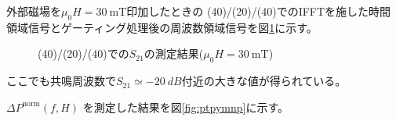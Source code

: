 \documentclass[dvipdfmx,11pt]{jsreport}
\numberwithin{equation}{chapter}
\numberwithin{table}{chapter}
\begin{document}
外部磁場を$\mu_0 H=\SI{30}{\milli \tesla}$印加したときの
(40)/(20)/(40)でのIFFTを施した時間領域信号とゲーティング処理後の周波数領域信号を図\ref{fig:k4}に示す。
\begin{figure}[H]
	\centering
		\caption{(40)/(20)/(40)での$S_{21}$の測定結果($\mu_0 H=\SI{30}{\milli \tesla}$)}
    \label{fig:k4}
\end{figure}
ここでも共鳴周波数で$S_{21}\simeq \SI{-20}{dB}$付近の大きな値が得られている。

$\Delta P^{\text{norm}}(f,H)$ を測定した結果を図\ref{fig:ptpymnp}に示す。
\end{document}
